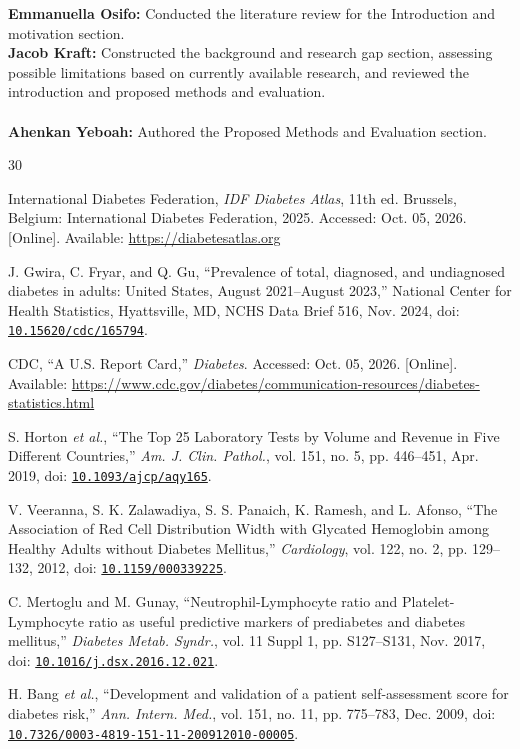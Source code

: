 \documentclass[conference]{IEEEtran}
\newcommand{\doi}[1]{\href{https://doi.org/#1}{\nolinkurl{#1}}}
\begin{document}
\noindent\textbf{Emmanuella Osifo:} Conducted the literature review for the Introduction and motivation section.\\
\noindent\textbf{Jacob Kraft:} Constructed the background and research gap section, assessing possible limitations based on currently available research, and reviewed the introduction and proposed methods and evaluation. \\
\\
\noindent\textbf{Ahenkan Yeboah:} Authored the Proposed Methods and Evaluation section.


\begin{thebibliography}{30}

International Diabetes Federation, \emph{IDF Diabetes Atlas}, 11th ed. Brussels, Belgium: International Diabetes Federation, 2025. Accessed: Oct. 05, 2026. [Online]. Available: \url{https://diabetesatlas.org}

J. Gwira, C. Fryar, and Q. Gu, ``Prevalence of total, diagnosed, and undiagnosed diabetes in adults: United States, August 2021--August 2023,'' National Center for Health Statistics, Hyattsville, MD, NCHS Data Brief 516, Nov. 2024, doi: \doi{10.15620/cdc/165794}.

CDC, ``A U.S. Report Card,'' \emph{Diabetes}. Accessed: Oct. 05, 2026. [Online]. Available: \url{https://www.cdc.gov/diabetes/communication-resources/diabetes-statistics.html}

S. Horton \emph{et al.}, ``The Top 25 Laboratory Tests by Volume and Revenue in Five Different Countries,'' \emph{Am. J. Clin. Pathol.}, vol. 151, no. 5, pp. 446--451, Apr. 2019, doi: \doi{10.1093/ajcp/aqy165}.

V. Veeranna, S. K. Zalawadiya, S. S. Panaich, K. Ramesh, and L. Afonso, ``The Association of Red Cell Distribution Width with Glycated Hemoglobin among Healthy Adults without Diabetes Mellitus,'' \emph{Cardiology}, vol. 122, no. 2, pp. 129--132, 2012, doi: \doi{10.1159/000339225}.

C. Mertoglu and M. Gunay, ``Neutrophil-Lymphocyte ratio and Platelet-Lymphocyte ratio as useful predictive markers of prediabetes and diabetes mellitus,'' \emph{Diabetes Metab. Syndr.}, vol. 11 Suppl 1, pp. S127--S131, Nov. 2017, doi: \doi{10.1016/j.dsx.2016.12.021}.

H. Bang \emph{et al.}, ``Development and validation of a patient self-assessment score for diabetes risk,'' \emph{Ann. Intern. Med.}, vol. 151, no. 11, pp. 775--783, Dec. 2009, doi: \doi{10.7326/0003-4819-151-11-200912010-00005}.


\end{thebibliography}
\end{document}
